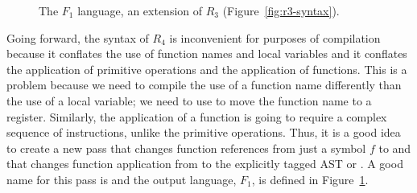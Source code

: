 \documentclass[11pt]{book}
\newcommand{\gray}[1]{{\color{lightgray} #1}}
\begin{document}
\begin{figure}[tp]
\centering
\fbox{
\begin{minipage}{0.96\textwidth}
\[
\begin{array}{lcl}
  \Type &::=& \gray{ \key{Integer} \mid \key{Boolean}
         \mid (\key{Vector}\;\Type^{+}) \mid \key{Void}  } \mid (\Type^{*} \; \key{->}\; \Type) \\
  \Exp &::=& \gray{ \Int \mid (\key{read}) \mid (\key{-}\;\Exp) \mid (\key{+} \; \Exp\;\Exp)}  \\
     &\mid&  (\key{function-ref}\, \itm{label})
     \mid \gray{ \Var \mid \LET{\Var}{\Exp}{\Exp} }\\
  &\mid& \gray{ \key{\#t} \mid \key{\#f} \mid
      (\key{and}\;\Exp\;\Exp) \mid (\key{not}\;\Exp)} \\
      &\mid& \gray{(\itm{cmp}\;\Exp\;\Exp) \mid \IF{\Exp}{\Exp}{\Exp}} \\
  &\mid& \gray{(\key{vector}\;\Exp^{+}) \mid
    (\key{vector-ref}\;\Exp\;\Int)} \\
  &\mid& \gray{(\key{vector-set!}\;\Exp\;\Int\;\Exp)\mid (\key{void})} \\
      &\mid& (\key{app}\, \Exp \; \Exp^{*}) \mid (\key{tailcall}\, \Exp \; \Exp^{*}) \\
  \Def &::=& (\key{define}\; (\itm{label} \; [\Var \key{:} \Type]^{*}) \key{:} \Type \; \Exp) \\
  F_1 &::=& (\key{program} \; \Def^{*} \; \Exp)
\end{array}
\]
\end{minipage}
}
\caption{The $F_1$ language, an extension of $R_3$
  (Figure~\ref{fig:r3-syntax}).}
\label{fig:f1-syntax}
\end{figure}

Going forward, the syntax of $R_4$ is inconvenient for purposes of
compilation because it conflates the use of function names and local
variables and it conflates the application of primitive operations and
the application of functions. This is a problem because we need to
compile the use of a function name differently than the use of a local
variable; we need to use  to move the function name to a
register. Similarly, the application of a function is going to require
a complex sequence of instructions, unlike the primitive
operations. Thus, it is a good idea to create a new pass that changes
function references from just a symbol $f$ to  and that changes function application from  to the explicitly tagged AST  or . A
good name for this pass is  and the output
language, $F_1$, is defined in Figure~\ref{fig:f1-syntax}.
\end{document}
